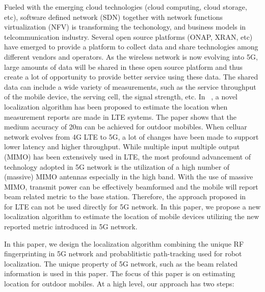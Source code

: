 \documentclass[conference, 10pt]{IEEEtran}
\begin{document}
Fueled with the emerging cloud technologies (cloud computing, cloud storage, etc), software defined network (SDN) together with 
network functions virtualization (NFV) is transforming the techonology, and business models in telcommunication industry.
Several open source platforms (ONAP, XRAN, etc) have emerged to provide a platform to collect data and share technologies among different 
vendors and operators. As the wireless network is now evolving into 5G, large amounts of data will be shared in these open source platform and thus create 
a lot of opportunity to provide better service using these data. The shared data can include a wide variety of measurements, such as the service throughput of the mobile 
device, the serving cell, the signal strength, etc. In ~\cite{Pantelis2016Localization}, a novel localization algorithm has been proposed to estimate 
the location when measurement reports are made in LTE systems. The paper shows that the medium accuracy of 20m can be achieved for outdoor mobibles. 
When celluar network evolves from 4G LTE to 5G, a lot of changes have been made to support lower latency and higher throughput. While multiple input multiple output (MIMO) has been extensively used in LTE, the most profound advancement of technology adopted in 5G
network is the utilization of a high number of (massive) MIMO antennas especially in the high band. With the use of massive MIMO, transmit power can be effectively beamformed and the mobile will report beam related metric to the base station. 
Therefore, the approach proposed in ~\cite{Pantelis2016Localization} for LTE can not be used directly for 5G network. In this paper, we propose a new localization algorithm to estimate the location of mobile devices utilizing the new reported metric introduced in 5G network.
 

In this paper, we design the localization algorithm combining the unique RF 
fingerprinting in 5G network and probablitistic path-tracking used for robot localization. The unique property of 5G network, such as the beam related 
information is used in this paper. The focus of this paper is on estimating location for outdoor mobiles. 
At a high level, our approach has two steps:
\end{document}
